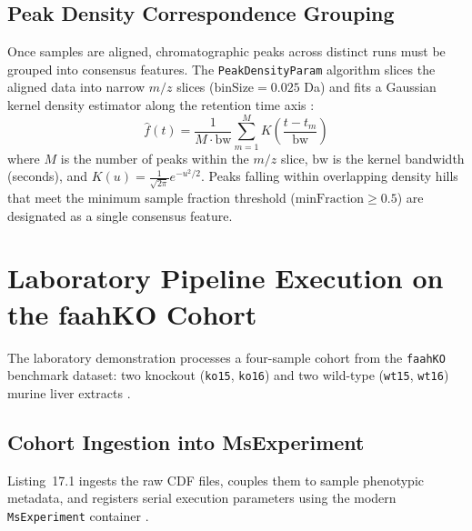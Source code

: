 \documentclass[11pt,twoside,openright]{book}
\begin{document}
\subsection{Peak Density Correspondence Grouping}

Once samples are aligned, chromatographic peaks across distinct runs must be grouped into consensus features. The \texttt{PeakDensityParam} algorithm slices the aligned data into narrow $m/z$ slices ($\text{binSize} = 0.025$ Da) and fits a Gaussian kernel density estimator along the retention time axis \cite{smith2006xcms}:
\begin{equation}
\hat{f}(t) = \frac{1}{M \cdot \text{bw}} \sum_{m=1}^M K\left( \frac{t - t_m}{\text{bw}} \right)
\label{eq:kde_grouping}
\end{equation}
where $M$ is the number of peaks within the $m/z$ slice, $\text{bw}$ is the kernel bandwidth (seconds), and $K(u) = \frac{1}{\sqrt{2\pi}} e^{-u^2/2}$. Peaks falling within overlapping density hills that meet the minimum sample fraction threshold ($\text{minFraction} \ge 0.5$) are designated as a single consensus feature.

\FloatBarrier
\section{Laboratory Pipeline Execution on the faahKO Cohort}
\label{sec:xcms_lab_execution}

The laboratory demonstration processes a four-sample cohort from the \texttt{faahKO} benchmark dataset: two knockout (\texttt{ko15}, \texttt{ko16}) and two wild-type (\texttt{wt15}, \texttt{wt16}) murine liver extracts \cite{cravatt2001faah, saghatelian2004activity}.

\subsection{Cohort Ingestion into MsExperiment}

Listing~17.1 ingests the raw CDF files, couples them to sample phenotypic metadata, and registers serial execution parameters using the modern \texttt{MsExperiment} container \cite{rainer2022msexperiment}.
\end{document}
